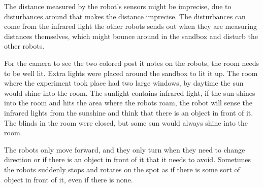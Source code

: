 The distance measured by the robot's sensors might be imprecise, due to disturbances around that makes the distance imprecise. The disturbances can come from the infrared light the other robots sends out when they are measuring distances themselves, which might bounce around in the sandbox and disturb the other robots. 

For the camera to see the two colored post it notes on the robots, the room needs to be well lit. Extra lights were placed around the sandbox to lit it up. The room where the experiment took place had two large windows, by daytime the sun would shine into the room. The sunlight contains infrared light, if the sun shines into the room and hits the area where the robots roam, the robot will sense the infrared lights from the sunshine and think that there is an object in front of it. The blinds in the room were closed, but some sun would always shine into the room.

The robots only move forward, and they only turn when they need to change direction or if there is an object in front of it that it needs to avoid. Sometimes the robots suddenly stops and rotates on the spot as if there is some sort of object in front of it, even if there is none.
